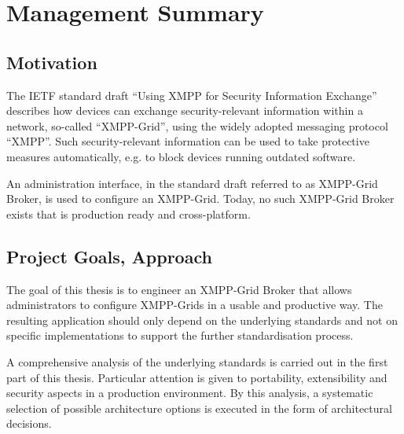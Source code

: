 
\chapter{Management Summary}

\section*{Motivation}
The IETF standard draft ``Using XMPP for Security Information Exchange'' describes how devices can exchange security-relevant information within a network, so-called ``XMPP-Grid'', using the widely adopted messaging protocol ``XMPP''.
Such security-relevant information can be used to take protective measures automatically, e.g. to block devices running outdated software.

An administration interface, in the standard draft referred to as XMPP-Grid Broker, is used to configure an XMPP-Grid.
Today, no such XMPP-Grid Broker exists that is production ready and cross-platform.

\section*{Project Goals, Approach}

The goal of this thesis is to engineer an XMPP-Grid Broker that allows administrators to configure XMPP-Grids in a usable and productive way.
The resulting application should only depend on the underlying standards and not on specific implementations to support the further standardisation process.

A comprehensive analysis of the underlying standards is carried out in the first part of this thesis.
Particular attention is given to portability, extensibility and security aspects in a production environment.
By this analysis, a systematic selection of possible architecture options is executed in the form of architectural decisions.


